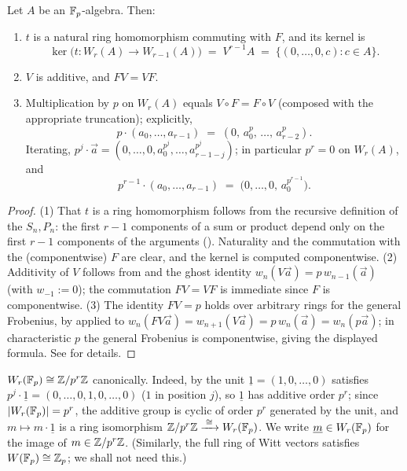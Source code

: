 \begin{prop}\label{prop:witt_multiplication_by_p:reorg}
Let $A$ be an $\mathbb{F}_p$-algebra. Then:
\begin{enumerate}
    \item $t$ is a natural ring homomorphism commuting with $F$, and its kernel is
    \[
    \ker\bigl(t \colon W_r(A) \to W_{r-1}(A)\bigr)
    \;=\; V^{r-1} A \;=\; \{(0, \dots, 0, c) : c \in A\}.
    \]
    \item $V$ is additive, and $F V = V F$.
    \item Multiplication by $p$ on $W_r(A)$ equals $V \circ F = F \circ V$
    (composed with the appropriate truncation); explicitly,
    \[
    p \cdot (a_0, \dots, a_{r-1}) \;=\; (0,\, a_0^p,\, \dots,\, a_{r-2}^p).
    \]
    Iterating, $p^j \cdot \vec a = (0, \dots, 0, a_0^{p^j}, \dots, a_{r-1-j}^{p^j})$;
    in particular $p^r = 0$ on $W_r(A)$, and
    \begin{equation}\label{eq:witt_p_to_r_minus_1:reorg}
    p^{r-1} \cdot (a_0, \dots, a_{r-1}) \;=\; \bigl(0, \dots, 0,\, a_0^{p^{r-1}}\bigr).
    \end{equation}
\end{enumerate}
\end{prop}

\begin{proof}
(1) That $t$ is a ring homomorphism follows from the recursive definition of the
$S_n, P_n$: the first $r-1$ components of a sum or product depend only on the first
$r-1$ components of the arguments (). Naturality and
the commutation with the (componentwise) $F$ are clear, and the kernel is computed
componentwise. (2) Additivity of $V$ follows from  and
the ghost identity $w_n(V\vec a) = p\, w_{n-1}(\vec a)$ (with $w_{-1} := 0$); the
commutation $FV = VF$ is immediate since $F$ is componentwise. (3) The identity
$F V = p$ holds over arbitrary rings for the general Frobenius, by
 applied to
$w_n(FV\vec a) = w_{n+1}(V \vec a) = p\, w_n(\vec a) = w_n(p \vec a)$; in
characteristic $p$ the general Frobenius is componentwise, giving the displayed
formula. See \cite[II, \S6, Proposition~8 ff.]{serreLF} for details.
\end{proof}

\begin{example}\label{example:witt_of_Fp:reorg}
$W_r(\mathbb{F}_p) \cong \mathbb{Z}/p^r\mathbb{Z}$ canonically. Indeed, by
 the unit $\underline 1 = (1, 0, \dots, 0)$ satisfies
$p^j \cdot \underline 1 = (0, \dots, 0, 1, 0, \dots, 0)$ ($1$ in position $j$), so
$\underline 1$ has additive order $p^r$; since $|W_r(\mathbb{F}_p)| = p^r$, the additive group
is cyclic of order $p^r$ generated by the unit, and $m \mapsto m \cdot \underline 1$
is a ring isomorphism $\mathbb{Z}/p^r\mathbb{Z} \xrightarrow{\;\cong\;} W_r(\mathbb{F}_p)$. We write
$\underline m \in W_r(\mathbb{F}_p)$ for the image of $m \in \mathbb{Z}/p^r\mathbb{Z}$. (Similarly, the full
ring of Witt vectors satisfies $W(\mathbb{F}_p) \cong \mathbb{Z}_p$; we shall not need this.)
\end{example}

